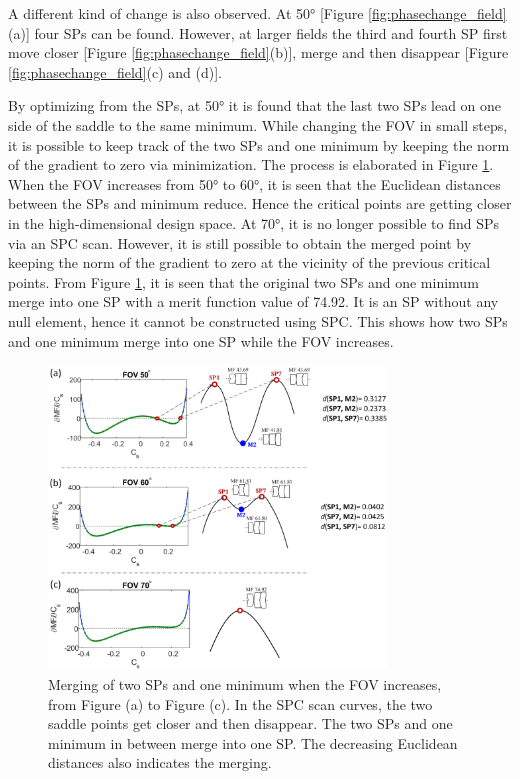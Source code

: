 A different kind of change is also observed. At 50° [Figure \ref{fig:phasechange_field}(a)] four SPs can be found. However, at larger fields the third and fourth SP first move closer [Figure \ref{fig:phasechange_field}(b)], merge and then disappear [Figure \ref{fig:phasechange_field}(c) and (d)]. 

By optimizing from the SPs, at 50° it is found that the last two SPs lead on one side of the saddle to the same minimum. While changing the FOV in small steps, it is possible to keep track of the two SPs and one minimum by keeping the norm of the gradient to zero via minimization. The process is elaborated in Figure \ref{fig:systemdie}. When the FOV increases from 50° to 60°, it is seen that the Euclidean distances between the SPs and minimum reduce. Hence the critical points are getting closer in the high-dimensional design space. At 70°, it is no longer possible to find SPs via an SPC scan. However, it is still possible to obtain the merged point by keeping the norm of the gradient to zero at the vicinity of the previous critical points. From Figure \ref{fig:systemdie}, it is seen that the original two SPs and one minimum merge into one SP with a merit function value of 74.92. It is an SP without any null element, hence it cannot be constructed using SPC. This shows how two SPs and one minimum merge into one SP while the FOV increases. 

\begin{figure}[h!]
    \centering
    \includegraphics[width=0.8\textwidth]{chapter-3/figures/SystemDie.png}
    \caption{Merging of two SPs and one minimum when the FOV increases, from Figure (a) to Figure (c). In the SPC scan curves, the two saddle points get closer and then disappear. The two SPs and one minimum in between merge into one SP. The decreasing Euclidean distances also indicates the merging.}
    \label{fig:systemdie}
\end{figure}

